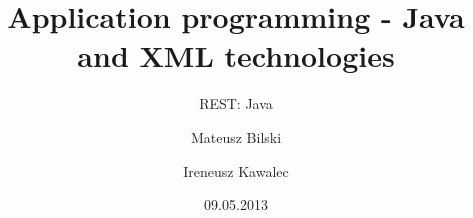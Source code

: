 \documentclass{beamer}
\title{Application programming - Java and XML technologies}
\subtitle{REST: Java}
\author{Mateusz Bilski \and Ireneusz Kawalec}
\institute[Wroclaw University of Technology]
\date{09.05.2013}
\begin{document}
 
	\begin{frame}
		\titlepage
	\end{frame}
	
	
	
\end{document}
